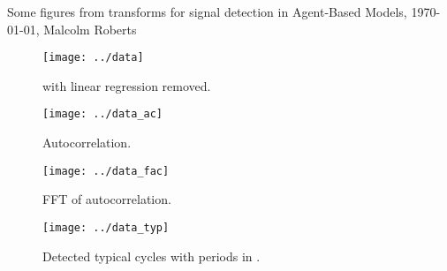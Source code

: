 \documentclass[a4paper]{article}
\newcommand{\thetitle}{Some figures from transforms for signal
  detection in Agent-Based Models}
\newcommand{\theauthor}{Malcolm Roberts}
\begin{document}
\begin{center}
  \thetitle{}, \today, \theauthor{}
\end{center}








\begin{figure}[htbp]
  \begin{center}        
    \texttt{[image: ../data]}
    \caption{\texttt{\filename} with linear regression removed.}
  \end{center}
\end{figure}

\begin{figure}[htbp]
  \begin{center}        
    \texttt{[image: ../data\_ac]}
    \caption{Autocorrelation.}
  \end{center}
\end{figure}

\begin{figure}[htbp]
  \begin{center}
    \texttt{[image: ../data\_fac]}
    \caption{FFT of autocorrelation.}
  \end{center}
\end{figure}

\begin{figure}[htbp]
  \begin{center}        
    \texttt{[image: ../data\_typ]}
    \caption{Detected typical cycles with periods in \periodlength{}.}
  \end{center}
\end{figure}
\end{document}
